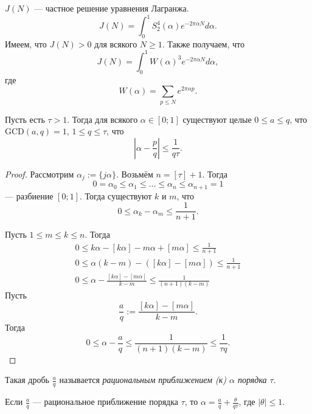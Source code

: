 \documentclass[12pt,a4paper]{article}
\newcommand{\GCD}{\mathrm{GCD}}
\begin{document}
    $J(N)$ --- частное решение уравнения Лагранжа.
    \[J(N) = \int_0^1 S_2^4(\alpha) e^{-2\pi \alpha N} d\alpha.\]
    Имеем, что $J(N) > 0$ для всякого $N \geqslant 1$. Также получаем, что
    \[J(N) = \int_0^1 W(\alpha)^3 e^{-2\pi \alpha N} d\alpha,\]
    где
    \[W(\alpha) = \sum_{p \leqslant N} e^{2\pi \alpha p}.\]

    \begin{theorem}
        Пусть есть $\tau > 1$. Тогда для всякого $\alpha \in [0; 1]$ существуют целые $0 \leqslant a \leqslant q$, что $\GCD(a, q) = 1$, $1 \leqslant q \leqslant \tau$, что
        \[\left|\alpha - \frac{p}{q}\right|  \leqslant \frac{1}{q \tau}.\]
    \end{theorem}

    \begin{proof}
        Рассмотрим $\alpha_j := \{j\alpha\}$. Возьмём $n = [\tau] + 1$. Тогда
        \[0 = \alpha_0 \leqslant \alpha_1 \leqslant \dots \leqslant \alpha_n \leqslant \alpha_{n+1} = 1\]
        --- разбиение $[0; 1]$. Тогда существуют $k$ и $m$, что
        \[0 \leqslant \alpha_k - \alpha_m \leqslant \frac{1}{n+1}.\]

        Пусть $1 \leqslant m \leqslant k \leqslant n$. Тогда
        \begin{gather*}
            0 \leqslant k \alpha - [k \alpha] - m \alpha + [m \alpha] \leqslant \frac{1}{n+1}\\
            0 \leqslant \alpha(k-m) - ([k \alpha] - [m \alpha]) \leqslant \frac{1}{n+1}\\
            0 \leqslant \alpha - \frac{[k \alpha] - [m \alpha]}{k-m} \leqslant \frac{1}{(n+1)(k-m)}
        \end{gather*}
        Пусть
        \[\frac{a}{q} := \frac{[k \alpha] - [m \alpha]}{k-m}.\]
        Тогда
        \[0 \leqslant \alpha - \frac{a}{q} \leqslant \frac{1}{(n+1)(k-m)} \leqslant \frac{1}{\tau q}.\]
    \end{proof}

    \begin{remark}
        Такая дробь $\frac{a}{q}$ называется \emph{рациональным приближением (к) $\alpha$ порядка $\tau$}.
    \end{remark}

    \begin{remark}
        Если $\frac{a}{q}$ --- рациональное приближение порядка $\tau$, то $\alpha = \frac{a}{q} + \frac{\theta}{q \tau}$, где $|\theta| \leqslant 1$.
    \end{remark}
\end{document}
